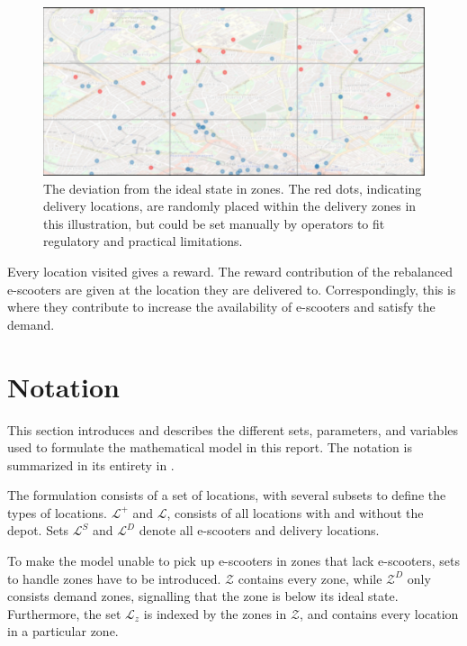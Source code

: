 \begin{figure}[h]
    \centering
    \includegraphics[width=15cm]{Images/deviation.png}
    \caption[The deviation from the ideal state in zones]{The deviation from the ideal state in zones. The red dots, indicating delivery locations, are randomly placed within the delivery zones in this illustration, but could be set manually by operators to fit regulatory and practical limitations.}
    \label{fig:deviation}
\end{figure}

Every location visited gives a reward. The reward contribution of the rebalanced e-scooters are given at the location they are delivered to. Correspondingly, this is where they contribute to increase the availability of e-scooters and satisfy the demand.

\section{Notation}\label{notation}
This section introduces and describes the different sets, parameters, and variables used to formulate the mathematical model in this report. The notation is summarized in its entirety in . 

The formulation consists of a set of locations, with several subsets to define the types of locations. $\mathcal{L}^{+}$ and $\mathcal{L}$, consists of all locations with and without the depot. Sets $\mathcal{L}^{S}$ and $\mathcal{L}^{D}$ denote all e-scooters and delivery locations.

To make the model unable to pick up e-scooters in zones that lack e-scooters, sets to handle zones have to be introduced. $\mathcal{Z}$ contains every zone, while $\mathcal{Z}^{D}$ only consists demand zones, signalling that the zone is below its ideal state. Furthermore, the set $\mathcal{L}_{z}$ is indexed by the zones in $\mathcal{Z}$, and contains every location in a particular zone. 

